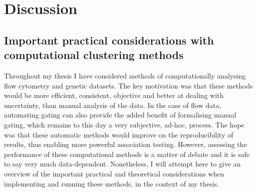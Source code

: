 \chapter{Discussion}


\section{ Important practical considerations with computational clustering methods }

Throughout my thesis I have considered methods of computationally analysing flow cytometry and genetic datasets.
The key motivation was that these methods would be more efficient, consistent, objective and better at dealing with uncertainty, than manual analysis of the data.
In the case of flow data, automating gating can also provide the added benefit of formalising manual gating, which remains to this day a very subjective, ad-hoc, process.
The hope was that these automatic methods would improve on the reproducibility of results, thus enabling more powerful association testing.
However, assessing the performance of these computational methods is a matter of debate and it is safe to say very much data-dependent.
Nonetheless, I will attempt here to give an overview of the important practical and theoretical considerations when implementing and running these methods, in the context of my thesis.

